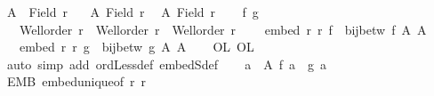 \begin{isabellebody}
\ {\isacharquery}{\kern0pt}A{}\ {\isacharequal}{\kern0pt}\ {\isachardoublequoteopen}Field\ r{}{\isachardoublequoteclose}\ \ \isamarkupfalse%
\ {\isacharquery}{\kern0pt}A{}\ {\isacharequal}{\kern0pt}{\isachardoublequoteopen}Field\ r{}{\isachardoublequoteclose}\ \isamarkupfalse%
\ {\isacharquery}{\kern0pt}A{}\ {\isacharequal}{\kern0pt}{\isachardoublequoteopen}Field\ r{}{\isachardoublequoteclose}\isanewline
\ \ \isamarkupfalse%
\ f{}{}\ g{}{}\ \isanewline
\ \ {}{\isacharcolon}{\kern0pt}\ {\isachardoublequoteopen}Well{\isacharunderscore}{\kern0pt}order\ r{}\ {\isasymand}\ Well{\isacharunderscore}{\kern0pt}order\ r{}\ {\isasymand}\ Well{\isacharunderscore}{\kern0pt}order\ r{}{\isachardoublequoteclose}\ \isanewline
\ \ {}{\isacharcolon}{\kern0pt}\ {\isachardoublequoteopen}embed\ r{}\ r{}\ f{}{}\ {\isasymand}\ {\isasymnot}{\isacharparenleft}{\kern0pt}bij{\isacharunderscore}{\kern0pt}betw\ f{}{}\ {\isacharquery}{\kern0pt}A{}\ {\isacharquery}{\kern0pt}A{}{\isacharparenright}{\kern0pt}{\isachardoublequoteclose}\ \isanewline
\ \ {}{\isacharcolon}{\kern0pt}\ {\isachardoublequoteopen}embed\ r{}\ r{}\ g{}{}\ {\isasymand}\ {\isasymnot}{\isacharparenleft}{\kern0pt}bij{\isacharunderscore}{\kern0pt}betw\ g{}{}\ {\isacharquery}{\kern0pt}A{}\ {\isacharquery}{\kern0pt}A{}{\isacharparenright}{\kern0pt}{\isachardoublequoteclose}\isanewline
\ \ \isamarkupfalse%
\ OL{}{}\ OL{}{}\ \isamarkupfalse%
\ {\isacharparenleft}{\kern0pt}auto\ simp\ add{\isacharcolon}{\kern0pt}\ ordLess{\isacharunderscore}{\kern0pt}def\ embedS{\isacharunderscore}{\kern0pt}def{\isacharparenright}{\kern0pt}\isanewline
\ \ \isamarkupfalse%
\ {\isachardoublequoteopen}{\isasymforall}a\ {\isasymin}\ {\isacharquery}{\kern0pt}A{}{\isachardot}{\kern0pt}\ f{}{}\ a\ {\isacharequal}{\kern0pt}\ g{}{}\ a{\isachardoublequoteclose}\isanewline
\ \ \isamarkupfalse%
\ EMB{}{}\ embed{\isacharunderscore}{\kern0pt}unique{\isacharbrackleft}{\kern0pt}of\ r{}\ r{}{\isacharbrackright}{\kern0pt}\ \isamarkupfalse%

\end{isabellebody}
